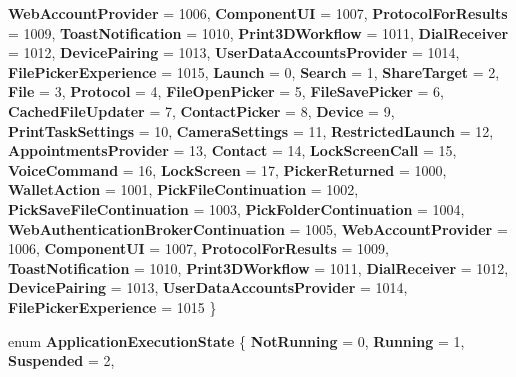 \begin{DoxyCompactItemize}
{\bfseries Web\+Account\+Provider} = 1006, 
\newline
{\bfseries Component\+UI} = 1007, 
{\bfseries Protocol\+For\+Results} = 1009, 
{\bfseries Toast\+Notification} = 1010, 
{\bfseries Print3\+D\+Workflow} = 1011, 
\newline
{\bfseries Dial\+Receiver} = 1012, 
{\bfseries Device\+Pairing} = 1013, 
{\bfseries User\+Data\+Accounts\+Provider} = 1014, 
{\bfseries File\+Picker\+Experience} = 1015, 
\newline
{\bfseries Launch} = 0, 
{\bfseries Search} = 1, 
{\bfseries Share\+Target} = 2, 
{\bfseries File} = 3, 
\newline
{\bfseries Protocol} = 4, 
{\bfseries File\+Open\+Picker} = 5, 
{\bfseries File\+Save\+Picker} = 6, 
{\bfseries Cached\+File\+Updater} = 7, 
\newline
{\bfseries Contact\+Picker} = 8, 
{\bfseries Device} = 9, 
{\bfseries Print\+Task\+Settings} = 10, 
{\bfseries Camera\+Settings} = 11, 
\newline
{\bfseries Restricted\+Launch} = 12, 
{\bfseries Appointments\+Provider} = 13, 
{\bfseries Contact} = 14, 
{\bfseries Lock\+Screen\+Call} = 15, 
\newline
{\bfseries Voice\+Command} = 16, 
{\bfseries Lock\+Screen} = 17, 
{\bfseries Picker\+Returned} = 1000, 
{\bfseries Wallet\+Action} = 1001, 
\newline
{\bfseries Pick\+File\+Continuation} = 1002, 
{\bfseries Pick\+Save\+File\+Continuation} = 1003, 
{\bfseries Pick\+Folder\+Continuation} = 1004, 
{\bfseries Web\+Authentication\+Broker\+Continuation} = 1005, 
\newline
{\bfseries Web\+Account\+Provider} = 1006, 
{\bfseries Component\+UI} = 1007, 
{\bfseries Protocol\+For\+Results} = 1009, 
{\bfseries Toast\+Notification} = 1010, 
\newline
{\bfseries Print3\+D\+Workflow} = 1011, 
{\bfseries Dial\+Receiver} = 1012, 
{\bfseries Device\+Pairing} = 1013, 
{\bfseries User\+Data\+Accounts\+Provider} = 1014, 
\newline
{\bfseries File\+Picker\+Experience} = 1015
 \}
\item 
\mbox{\label{namespace_windows_1_1_application_model_1_1_activation_a03c52b98bf1430c4332252ef7e86b265}} 
enum {\bfseries Application\+Execution\+State} \{ \newline
{\bfseries Not\+Running} = 0, 
{\bfseries Running} = 1, 
{\bfseries Suspended} = 2, 

\end{DoxyCompactItemize}
